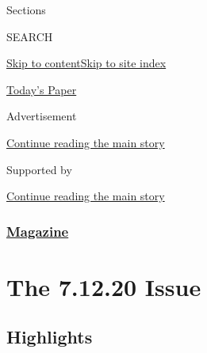Sections

SEARCH

\protect\hyperlink{site-content}{Skip to
content}\protect\hyperlink{site-index}{Skip to site index}

\href{https://myaccount.nytimes3xbfgragh.onion/auth/login?response_type=cookie\&client_id=vi}{}

\href{https://www.nytimes3xbfgragh.onion/section/todayspaper}{Today's
Paper}

Advertisement

\protect\hyperlink{after-top}{Continue reading the main story}

Supported by

\protect\hyperlink{after-sponsor}{Continue reading the main story}

\hypertarget{magazine}{%
\subsubsection{\texorpdfstring{\href{/section/magazine}{Magazine}}{Magazine}}\label{magazine}}

\hypertarget{the-71220-issue}{%
\section{The 7.12.20 Issue}\label{the-71220-issue}}

\hypertarget{highlights}{%
\subsection{Highlights}\label{highlights}}

